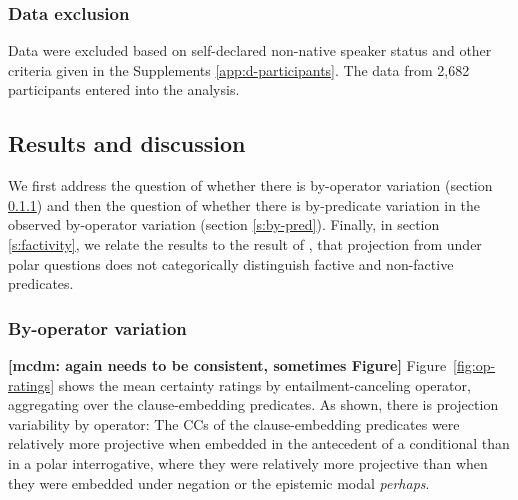 \documentclass[a4paper,12pt,twoside]{article}
\newcommand{\mcdm}[1]{\textbf{\color{blue}[mcdm: #1]}}
\newcommand{\posscite}[1]{\citeauthor{#1}'s (\citeyear{#1})}
\begin{document}
        \subsubsection{Data exclusion}

        Data were excluded based on self-declared non-native speaker status and other criteria given in the Supplements \ref{app:d-participants}. The data from 2,682 participants entered into the analysis.  


    \subsection{Results and discussion}

    We first address the question of whether there is by-operator variation (section \ref{s:by-op}) and then the question of whether there is by-predicate variation in the observed by-operator variation (section \ref{s:by-pred}). Finally, in section \ref{s:factivity}, we relate the results to the result of \citealt{degen_are_2022}, that projection from under polar questions does not categorically distinguish factive and non-factive predicates.
    
		
	\subsubsection{By-operator variation}\label{s:by-op}

        \mcdm{again needs to be consistent, sometimes Figure} Figure~\ref{fig:op-ratings} shows the mean certainty ratings by entailment-canceling operator, aggregating over the clause-embedding predicates. As shown, there is projection variability by operator: The CCs of the clause-embedding predicates were relatively more projective when embedded in the antecedent of a conditional than in a polar interrogative, where they were relatively more projective than when they were embedded under negation or the epistemic modal {\em perhaps}.
  
\end{document}
